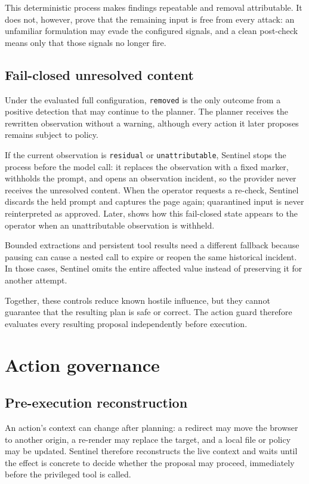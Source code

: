 This deterministic process makes findings repeatable and removal attributable.
It does not, however, prove that the remaining input is free from every attack:
an unfamiliar formulation may evade the configured signals, and a clean
post-check means only that those signals no longer fire.

\subsection{Fail-closed unresolved content}

Under the evaluated full configuration, \texttt{removed} is the only outcome
from a positive detection that may continue to the planner. The planner receives
the rewritten observation without a warning, although every action it later
proposes remains subject to policy.

If the current observation is \texttt{residual} or \texttt{unattributable},
Sentinel stops the process before the model call: it replaces the observation
with a fixed marker, withholds the prompt, and opens an observation incident, so
the provider never receives the unresolved content. When the operator requests
a re-check, Sentinel discards the held prompt and captures the page again;
quarantined input is never reinterpreted as approved.
Later,  shows how this fail-closed state
appears to the operator when an unattributable observation is withheld.

Bounded extractions and persistent tool results need a different fallback
because pausing can cause a nested call to expire or reopen the same historical
incident. In those cases, Sentinel omits the entire affected value instead of
preserving it for another attempt.

Together, these controls reduce known hostile influence, but they cannot
guarantee that the resulting plan is safe or correct. The action guard therefore
evaluates every resulting proposal independently before execution.

\section{Action governance}
\label{sec:action-governance}

\subsection{Pre-execution reconstruction}

An action's context can change after planning: a redirect may move the browser
to another origin, a re-render may replace the target, and a local file or
policy may be updated. Sentinel therefore reconstructs the live context and
waits until the effect is concrete to decide whether the proposal may proceed,
immediately before the privileged tool is called.

